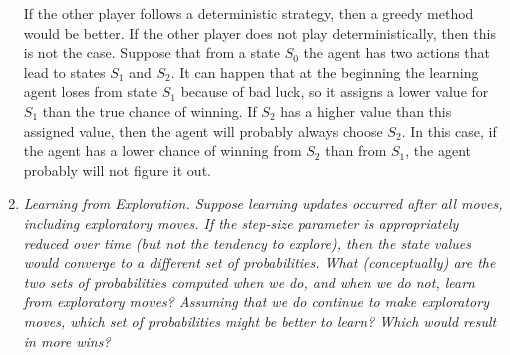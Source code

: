 \documentclass[12pt,a4paper]{article}
\begin{document}
\begin{enumerate}
    If the other player follows a deterministic strategy, then a greedy method would be better. If the other player does not play deterministically, then this is not the case. Suppose that from a state $S_0$ the agent has two actions that lead to states $S_1$ and $S_2$. It can happen that at the beginning the learning agent loses from state $S_1$ because of bad luck, so it assigns a lower value for $S_1$ than the true chance of winning. If $S_2$ has a higher value than this assigned value, then the agent will probably always choose $S_2$. In this case, if the agent has a lower chance of winning from $S_2$ than from $S_1$, the agent probably will not figure it out.

  \item
    \textit{Learning from Exploration. Suppose learning updates occurred after all moves, including exploratory moves. If the step-size parameter is appropriately reduced over time (but not the tendency to explore), then the state values would converge to a different set of probabilities. What (conceptually) are the two sets of probabilities computed when we do, and when we do not, learn from exploratory moves? Assuming that we do continue to make exploratory moves, which set of probabilities might be better to learn? Which would result in more wins?}


\end{enumerate}
\end{document}
